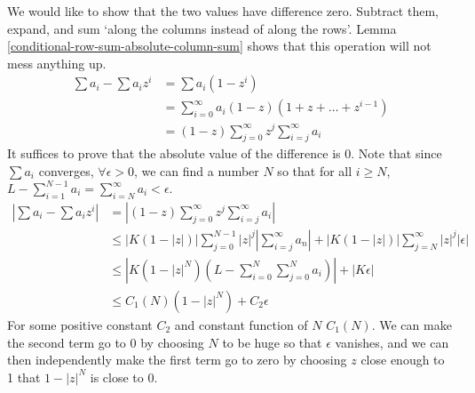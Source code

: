 \documentclass{homework}
\begin{document}
\begin{solution}
                                                                             We would like to show that the two values have difference zero. Subtract them, expand, and sum `along the columns instead of along the rows'. Lemma \ref{conditional-row-sum-absolute-column-sum} shows that this operation will not mess anything up.
                                                                             \begin{align*}
                                                                             \sum a_i - \sum a_iz^i &= \sum a_i(1-z^i)\\
                                                                             &= \sum_{i=0}^\infty a_i(1-z)(1 + z + \dots + z^{i-1})\\
                                                                             &= (1 - z)\sum_{j=0}^\infty z^j\sum_{i=j}^\infty a_i
                                                                             \end{align*}
                                                                             It suffices to prove that the absolute value of the difference is 0. Note that since $\sum a_i$ converges, $\forall \epsilon > 0$, we can find a number $N$ so that for all $i\geq N$, $L-\sum_{i=1}^{N-1} a_i = \sum_{i=N}^\infty a_i < \epsilon.$
                                                                             \begin{align*}
                                                                             |\sum a_i - \sum a_iz^i| &=  \left|(1 - z)\sum_{j=0}^\infty z^j\sum_{i=j}^\infty a_i\right|\\
                                                                             &\leq \left|K(1 - |z|)\right|\sum_{j=0}^{N-1} |z|^j\left|\sum_{i=j}^\infty a_n\right| + \left|K(1 - |z|)\right|\sum_{j=N}^\infty |z|^j|\epsilon|\\
                                                                             &\leq \left|K(1 - |z|^{N})(L-\sum_{i=0}^N\sum_{j=0}^N a_i)\right| +
                                                                             |K\epsilon|\\
                                                                             &\leq C_1(N)(1 - |z|^{N}) + C_2\epsilon
                                                                             \end{align*}
                                                                             For some positive constant $C_2$ and constant function of $N$ $C_1(N)$. We can make the second term go to 0 by choosing $N$ to be huge so that $\epsilon$ vanishes, and we can then independently make the first term go to zero by choosing $z$ close enough to 1 that $1-|z|^N$ is close to 0.
                                                                             \end{solution}
\end{document}
